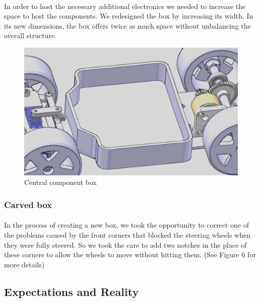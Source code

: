 \paragraph{}
In order to host the necessary additional electronics we needed to increase the
space to host the components. We redesigned the box by increasing its width.
In its new dimensions, the box offers twice as much space without unbalancing
the overall structure.

\begin{figure}[!ht]
    \begin{center}
        \includegraphics[scale=0.45]{Images/kart_central_box.png}
    \end{center}
    \caption{Central component box}
    \label{fig:Central_box}
\end{figure}

\subsubsection{Carved box}
\paragraph{}

In the process of creating a new box, we took the opportunity to correct one
of the problems caused by the front corners that blocked the steering wheels
when they were fully steered. So we took the care to add two notches in
the place of these corners to allow the wheels to move without hitting them.
(See Figure 6 for more details)

\subsection{Expectations and Reality}
